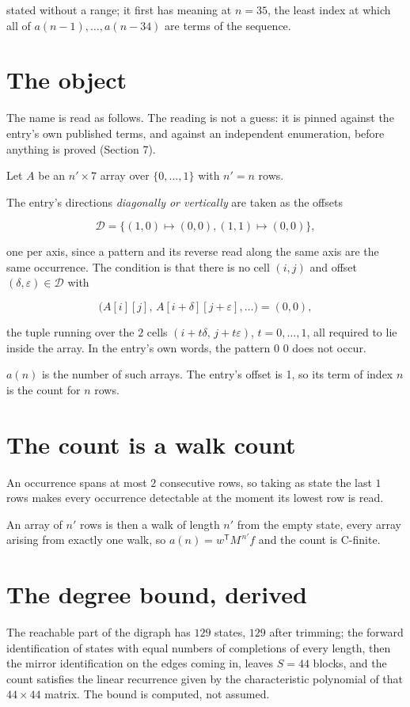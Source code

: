 \documentclass[11pt]{article}
\theoremstyle{definition}
\begin{document}
stated without a range; it first has meaning at $n = 35$, the least index at which all of $a(n-1),\dots,a(n-34)$ are terms of the sequence.

\section{The object}

The name is read as follows. The reading is not a guess: it is pinned against the entry's own published terms, and against an independent enumeration, before anything is proved (Section 7).

Let $A$ be an $n' \times 7$ array over $\{0,\dots,1\}$ with $n' = n$ rows.

The entry's directions {\itshape diagonally or vertically} are taken as the offsets

\[\mathcal{D} = \{(1,0)\mapsto(0,0), (1,1)\mapsto(0,0)\},\]

one per axis, since a pattern and its reverse read along the same axis are the same occurrence. The condition is that there is no cell $(i,j)$ and offset $(\delta,\varepsilon)\in\mathcal{D}$ with

\[\bigl(A[i][j],\,A[i{+}\delta][j{+}\varepsilon],\dots\bigr) = (0, 0),\]

the tuple running over the $2$ cells $(i+t\delta,\,j+t\varepsilon)$, $t = 0,\dots,1$, all required to lie inside the array. In the entry's own words, the pattern 0 0 does not occur.

$a(n)$ is the number of such arrays. The entry's offset is 1, so its term of index $n$ is the count for $n$ rows.

\section{The count is a walk count}

An occurrence spans at most $2$ consecutive rows, so taking as state the last $1$ rows makes every occurrence detectable at the moment its lowest row is read.

An array of $n'$ rows is then a walk of length $n'$ from the empty state, every array arising from exactly one walk, so $a(n) = w^{\mathsf T}M^{\,n'}f$ and the count is C-finite.

\section{The degree bound, derived}

The reachable part of the digraph has $129$ states, $129$ after trimming; the forward identification of states with equal numbers of completions of every length, then the mirror identification on the edges coming in, leaves $S = 44$ blocks, and the count satisfies the linear recurrence given by the characteristic polynomial of that $44\times44$ matrix. The bound is computed, not assumed.
\end{document}
